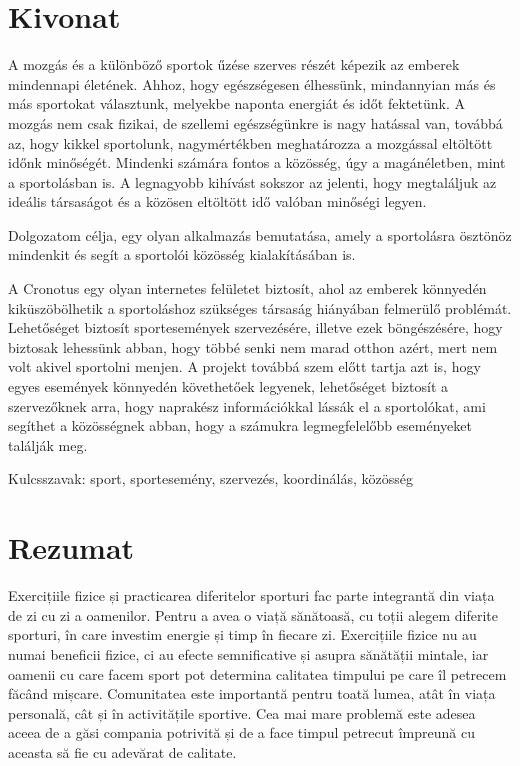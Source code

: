 
\hungarianParagraph

\chapter*{Kivonat}
A mozgás és a különböző sportok űzése szerves részét képezik az emberek mindennapi
  életének. Ahhoz, hogy egészségesen élhessünk, mindannyian más és más sportokat választunk,
  melyekbe naponta energiát és időt fektetünk. A mozgás nem csak fizikai, de szellemi
  egészségünkre is nagy hatással van, továbbá az, hogy kikkel sportolunk, nagymértékben
  meghatározza a mozgással eltöltött időnk minőségét\cite{warner2017yielding}. Mindenki számára fontos a közösség, úgy a
  magánéletben, mint a sportolásban is. A legnagyobb kihívást sokszor az jelenti, hogy
  megtaláljuk az ideális társaságot és a közösen eltöltött idő valóban minőségi legyen.
  
  Dolgozatom célja, egy olyan alkalmazás bemutatása, amely a sportolásra ösztönöz
  mindenkit és segít a sportolói közösség kialakításában is.
  
  A Cronotus egy olyan internetes felületet biztosít, ahol az emberek könnyedén
  kiküszöbölhetik a sportoláshoz szükséges társaság hiányában felmerülő problémát. Lehetőséget
  biztosít sportesemények szervezésére, illetve ezek böngészésére, hogy biztosak lehessünk abban,
  hogy többé senki nem marad otthon azért, mert nem volt akivel sportolni menjen. A projekt
  továbbá szem előtt tartja azt is, hogy egyes események könnyedén követhetőek legyenek,
  lehetőséget biztosít a szervezőknek arra, hogy naprakész információkkal lássák el a sportolókat,
  ami segíthet a közösségnek abban, hogy
  a számukra legmegfelelőbb eseményeket találják meg.



\vfill
Kulcsszavak: sport, sportesemény, szervezés, koordinálás, közösség
\clearpage
{}

\chapter*{Rezumat}
Exercițiile fizice și practicarea diferitelor sporturi fac parte integrantă din viața de zi cu zi a oamenilor.
  Pentru a avea o viață sănătoasă, cu toții alegem diferite sporturi,
  în care investim energie și timp în fiecare zi. Exercițiile fizice nu au numai beneficii fizice, ci au efecte semnificative și asupra sănătății mintale,
  iar oamenii cu care facem sport pot determina calitatea timpului pe care îl petrecem făcând mișcare.\cite{warner2017yielding} Comunitatea este importantă
  pentru toată lumea, atât în viața personală, cât și în activitățile sportive. Cea mai mare problemă este adesea aceea de a găsi compania potrivită și de a face timpul petrecut împreună cu aceasta să fie cu adevărat de calitate.
  
